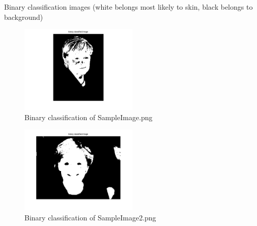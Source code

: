 \documentclass[conference]{IEEEtran}
\begin{document}
\begin{compactenum}[a)]
\newpage
\item Binary classification images (white belongs most likely to skin, black belongs to background)
\begin{figure}[h!]
  	\centering
    \includegraphics[width=0.5\textwidth]{img/SampleImage-bin.png}
    \caption{Binary classification of SampleImage.png}
    \label{fig:bin1}
\end{figure}
\begin{figure}[h!]
  	\centering
    \includegraphics[width=0.5\textwidth]{img/SampleImage2-bin.png}
    \caption{Binary classification of SampleImage2.png}
    \label{fig:bin2}
\end{figure}


\end{compactenum}
\end{document}
